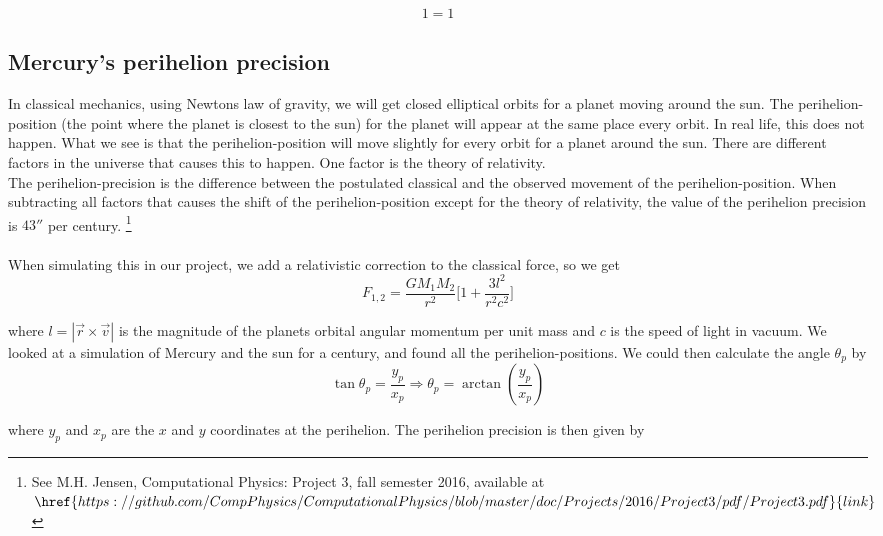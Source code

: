 \documentclass[%
 reprint,
 nobalance,
 amsmath,amssymb,
 aps,
]{revtex4-1}
\begin{document}
\begin{equation}\label{eq:22} %
	1 = 1
\end{equation}

\subsection{\label{sec:Thi} Mercury's perihelion precision}

In classical mechanics, using Newtons law of gravity, we will get closed elliptical orbits for a planet moving around the sun. The perihelion-position (the point where the planet is closest to the sun) for the planet will appear at the same place every orbit. In real life, this does not happen. What we see is that the perihelion-position will move slightly for every orbit for a planet around the sun. There are different factors in the universe that causes this to happen. One factor is the theory of relativity. \\
The perihelion-precision is the difference between the postulated classical and the observed movement of the perihelion-position. When subtracting all factors that causes the shift of the perihelion-position except for the theory of relativity, the value of the perihelion precision is $43''$ per century. \footnote{See M.H. Jensen, Computational Physics: Project 3, fall semester 2016, available at $\href{https://github.com/CompPhysics/ComputationalPhysics/blob/master/doc/Projects/2016/Project3/pdf/Project3.pdf}{link}$}
\\\\
When simulating this in our project, we add a relativistic correction to the classical force, so we get
\begin{equation}
F_{1,2} = \frac{GM_1M_2}{r^2}\bigg[ 1 + \frac{3l^2}{r^2c^2}\bigg]
\end{equation}

where $l = |\vec{r} \times \vec{v}|$ is the magnitude of the planets orbital angular momentum per unit mass and $c$ is the speed of light in vacuum. We looked at a simulation of Mercury and the sun for a century, and found all the perihelion-positions. We could then calculate the angle $\theta_p$ by 
\begin{equation}
\tan \theta_p = \frac{y_p}{x_p} \Rightarrow \theta_p = \arctan(\frac{y_p}{x_p})
\end{equation}

where $y_p$ and $x_p$ are the $x$ and $y$ coordinates at the perihelion. The perihelion precision is then given by
\end{document}
